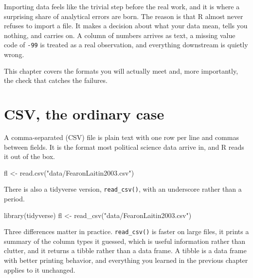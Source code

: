 \documentclass[
  a4paper,
]{scrbook}
\newenvironment{Shaded}{\begin{snugshade}}{\end{snugshade}}
\newcommand{\FunctionTok}[1]{\textcolor[rgb]{0.28,0.35,0.67}{#1}}
\newcommand{\NormalTok}[1]{\textcolor[rgb]{0.00,0.23,0.31}{#1}}
\newcommand{\OtherTok}[1]{\textcolor[rgb]{0.00,0.23,0.31}{#1}}
\newcommand{\StringTok}[1]{\textcolor[rgb]{0.13,0.47,0.30}{#1}}
\begin{document}

Importing data feels like the trivial step before the real work, and it
is where a surprising share of analytical errors are born. The reason is
that R almost never refuses to import a file. It makes a decision about
what your data mean, tells you nothing, and carries on. A column of
numbers arrives as text, a missing value code of \texttt{-99} is treated
as a real observation, and everything downstream is quietly wrong.

This chapter covers the formats you will actually meet and, more
importantly, the check that catches the failures.

\section*{CSV, the ordinary case}\label{csv-the-ordinary-case}


A comma-separated (CSV) file is plain text with one row per line and
commas between fields. It is the format most political science data
arrive in, and R reads it out of the box.

\begin{Shaded}
\begin{Highlighting}[]
\NormalTok{fl }\OtherTok{\textless{}{-}} \FunctionTok{read.csv}\NormalTok{(}\StringTok{"data/FearonLaitin2003.csv"}\NormalTok{)}
\end{Highlighting}
\end{Shaded}

There is also a tidyverse version, \texttt{read\_csv()}, with an
underscore rather than a period.

\begin{Shaded}
\begin{Highlighting}[]
\FunctionTok{library}\NormalTok{(tidyverse)}
\NormalTok{fl }\OtherTok{\textless{}{-}} \FunctionTok{read\_csv}\NormalTok{(}\StringTok{"data/FearonLaitin2003.csv"}\NormalTok{)}
\end{Highlighting}
\end{Shaded}

Three differences matter in practice. \texttt{read\_csv()} is faster on
large files, it prints a summary of the column types it guessed, which
is useful information rather than clutter, and it returns a tibble
rather than a data frame. A tibble is a data frame with better printing
behavior, and everything you learned in the previous chapter applies to
it unchanged.
\end{document}
